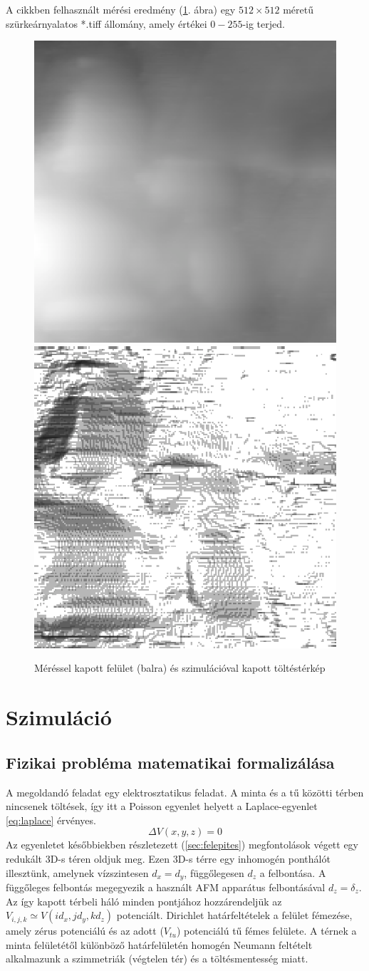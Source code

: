	A cikkben felhasznált mérési eredmény (\ref{fig:felulet}. ábra) egy
	$512\times512$ méretű szürkeárnyalatos *.tiff állomány, amely értékei $0-255$-ig terjed.
	
	\begin{figure}[!h]
		\centering
		\includegraphics[width=0.45\columnwidth]{kepek/eps/afm200.eps}
		\includegraphics[width=0.45\columnwidth]{kepek/eps/efm200.eps}
		\caption{\scriptsize Méréssel kapott felület (balra) és szimulációval kapott töltéstérkép}
		\label{fig:felulet}
	\end{figure}
	
	
	
\section{Szimuláció} 
\subsection{Fizikai probléma matematikai formalizálása}
	
	A megoldandó feladat egy elektrosztatikus feladat.
	A minta és a tű közötti térben nincsenek töltések, így itt a Poisson egyenlet helyett a
	Laplace-egyenlet \eqref{eq:laplace} érvényes.
	\begin{equation}\label{eq:laplace}
		\Delta V(x,y,z) = 0 
	\end{equation}
	Az egyenletet későbbiekben részletezett (\ref{sec:felepites}) megfontolások végett egy redukált
	3D-s téren oldjuk meg.
	Ezen 3D-s térre egy inhomogén ponthálót illesztünk, amelynek vízszintesen $d_x = d_y$,
	függőlegesen $d_z$ a felbontása. A függőleges felbontás megegyezik a használt AFM apparátus
	felbontásával $d_z = \delta_z$.
	Az így kapott térbeli háló minden pontjához hozzárendeljük az $V_{i,j,k} \simeq V(id_x,jd_y,kd_z)$
	potenciált.
	Dirichlet határfeltételek a felület fémezése, amely zérus potenciálú és az adott ($V_{tu}$)
	potenciálú  tű fémes felülete.
	A térnek a minta felületétől különböző határfelületén homogén Neumann feltételt alkalmazunk
	a szimmetriák (végtelen tér) és a töltésmentesség miatt.
	
